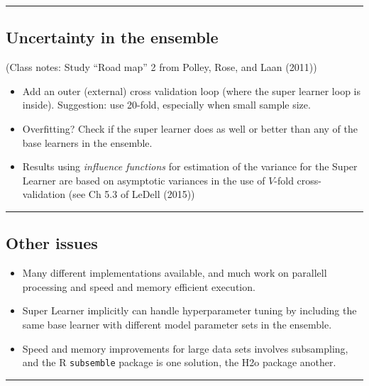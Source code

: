 \documentclass[
  letterpaper,
  DIV=11,
  numbers=noendperiod]{scrartcl}
\begin{document}
\begin{center}\rule{0.5\linewidth}{0.5pt}\end{center}

\hypertarget{uncertainty-in-the-ensemble}{%
\subsection{Uncertainty in the
ensemble}\label{uncertainty-in-the-ensemble}}

(Class notes: Study ``Road map'' 2 from Polley, Rose, and Laan (2011))

\begin{itemize}
\item
  Add an outer (external) cross validation loop (where the super learner
  loop is inside). Suggestion: use 20-fold, especially when small sample
  size.
\item
  Overfitting? Check if the super learner does as well or better than
  any of the base learners in the ensemble.
\item
  Results using \emph{influence functions} for estimation of the
  variance for the Super Learner are based on asymptotic variances in
  the use of \(V\)-fold cross-validation (see Ch 5.3 of LeDell (2015))
\end{itemize}

\begin{center}\rule{0.5\linewidth}{0.5pt}\end{center}

\hypertarget{other-issues}{%
\subsection{Other issues}\label{other-issues}}

\begin{itemize}
\item
  Many different implementations available, and much work on parallell
  processing and speed and memory efficient execution.
\item
  Super Learner implicitly can handle hyperparameter tuning by including
  the same base learner with different model parameter sets in the
  ensemble.
\item
  Speed and memory improvements for large data sets involves
  subsampling, and the R \texttt{subsemble} package is one solution, the
  H2o package another.
\end{itemize}

\begin{center}\rule{0.5\linewidth}{0.5pt}\end{center}
\end{document}
